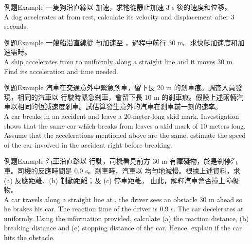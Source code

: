 \documentclass[beamer=true]{standalone}
\begin{document}
\begin{frame}[t]{例題Example}
    一隻狗沿直線以  加速，求牠從靜止加速 3 s 後的速度和位移。 \\A dog accelerates at  from rest, calculate its velocity and displacement after 3 seconds.
\end{frame}
\begin{frame}[t]{例題Example}
    一艘船沿直線從  勻加速至 ，過程中航行 30 m。求快艇加速度和加速需時。\\A ship accelerates from  to  uniformly along a straight line and it moves 30 m. Find its acceleration and time needed.
\end{frame}
\begin{frame}[t]{例題Example}
    汽車在交通意外中緊急剎車，留下長 20 m 的剎車痕。調査人員發現，相同的汽車以  行駛時緊急剎車，會留下長 10 m 的剎車痕。假設上述兩輛汽車以相同的恆減速度剎車。試估算發生意外的汽車在剎車前一刻的速率。 \\A car breaks in an accident and leave a 20-meter-long skid mark. Investigation shows that the same car which breaks from  leaves a skid mark of 10 meters long. Assume that the accelerations mentioned above are the same, estimate the speed of the car involved in the accident right before breaking.
\end{frame}
\begin{frame}[t]{例題Example}
    汽車沿直路以  行駛，司機看見前方 30 m 有障礙物，於是剎停汽車。司機的反應時間是 0.9 s。剎車時，汽車以  均勻地減慢。根據上述資料，求 (a) 反應距離、(b) 制動距離；及 (c) 停車距離。 由此，解釋汽車會否撞上障礙物。\\A car travels along a straight line at , the driver sees an obstacle 30 m ahead so he brakes his car. The reaction time of the driver is 0.9 s. The car decelerates at  uniformly. Using the information provided, calculate (a) the reaction distance, (b) breaking distance and (c) stopping distance of the car. Hence, explain if the car hits the obstacle.
\end{frame}
\end{document}

